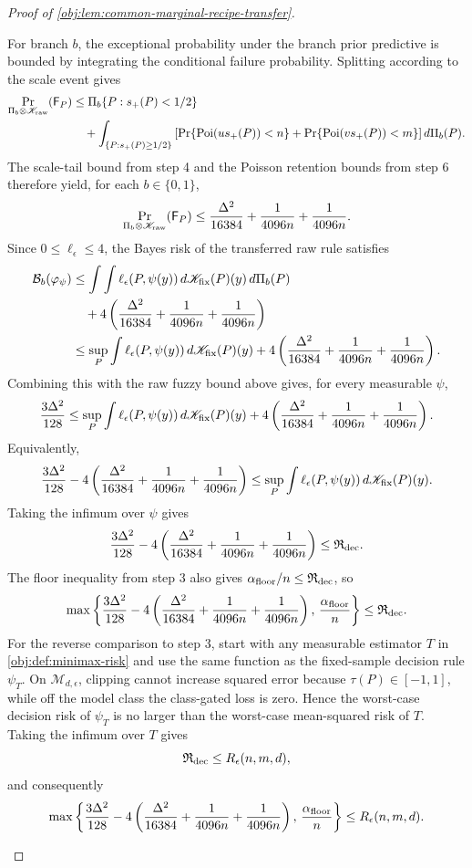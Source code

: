 \documentclass[11pt]{article}
\begin{document}
\begin{proof}[Proof of \cref{obj:lem:common-marginal-recipe-transfer}]
\begin{enumerate}
For branch \(b\), the exceptional probability under the branch prior predictive is bounded by integrating the conditional failure probability.  Splitting according to the scale event gives
\[
\begin{aligned}
\Pr_{\Pi_b\otimes\mathscr K_{\rm raw}}(\mathsf F_P)
&\le
\Pi_b\{P:s_+(P)<1/2\} \\
&\quad+
\int_{\{P:s_+(P)\ge1/2\}}
\left[
\Pr\{\operatorname{Poi}(u s_+(P))<n\}
+
\Pr\{\operatorname{Poi}(v s_+(P))<m\}
\right]d\Pi_b(P).
\end{aligned}
\]
The scale-tail bound from step 4 and the Poisson retention bounds from step 6 therefore yield, for each \(b\in\{0,1\}\),
\[
\Pr_{\Pi_b\otimes\mathscr K_{\rm raw}}(\mathsf F_P)
\le
\frac{\Delta^2}{16384}
+\frac1{4096n}
+\frac1{4096n}.
\]
Since \(0\le\ell_\epsilon\le4\), the Bayes risk of the transferred raw rule satisfies
\[
\begin{aligned}
\mathcal B_b(\varphi_\psi)
&\le
\int
\int \ell_\epsilon(P,\psi(y))\,d\mathscr K_{\rm fix}(P)(y)\,d\Pi_b(P)\\
&\quad+
4\left(
\frac{\Delta^2}{16384}
+\frac1{4096n}
+\frac1{4096n}
\right)\\
&\le
\sup_{P}\int \ell_\epsilon(P,\psi(y))\,d\mathscr K_{\rm fix}(P)(y)
+
4\left(
\frac{\Delta^2}{16384}
+\frac1{4096n}
+\frac1{4096n}
\right).
\end{aligned}
\]
Combining this with the raw fuzzy bound above gives, for every measurable \(\psi\),
\[
\frac{3\Delta^2}{128}
\le
\sup_{P}\int \ell_\epsilon(P,\psi(y))\,d\mathscr K_{\rm fix}(P)(y)
+
4\left(
\frac{\Delta^2}{16384}
+\frac1{4096n}
+\frac1{4096n}
\right).
\]
Equivalently,
\[
\frac{3\Delta^2}{128}
-
4\left(
\frac{\Delta^2}{16384}
+\frac1{4096n}
+\frac1{4096n}
\right)
\le
\sup_{P}\int \ell_\epsilon(P,\psi(y))\,d\mathscr K_{\rm fix}(P)(y).
\]
Taking the infimum over \(\psi\) gives
\[
\frac{3\Delta^2}{128}
-
4\left(
\frac{\Delta^2}{16384}
+\frac1{4096n}
+\frac1{4096n}
\right)
\le
\mathfrak R_{\rm dec}.
\]
The floor inequality from step 3 also gives \(\alpha_{\rm floor}/n\le\mathfrak R_{\rm dec}\), so
\[
\max\left\{
\frac{3\Delta^2}{128}
-
4\left(
\frac{\Delta^2}{16384}
+\frac1{4096n}
+\frac1{4096n}
\right),
\,
\frac{\alpha_{\rm floor}}{n}
\right\}
\le
\mathfrak R_{\rm dec}.
\]
For the reverse comparison to step 3, start with any measurable estimator \(T\) in
\cref{obj:def:minimax-risk} and use the same function as the fixed-sample decision rule
\(\psi_T\).  On \(\mathcal M_{d,\epsilon}\), clipping cannot increase squared error because
\(\tau(P)\in[-1,1]\), while off the model class the class-gated loss is zero.  Hence the
worst-case decision risk of \(\psi_T\) is no larger than the worst-case mean-squared risk of
\(T\).  Taking the infimum over \(T\) gives
\[
\mathfrak R_{\rm dec}
\le
R_\epsilon(n,m,d),
\]
and consequently
\[
\max\left\{
\frac{3\Delta^2}{128}
-
4\left(
\frac{\Delta^2}{16384}
+\frac1{4096n}
+\frac1{4096n}
\right),
\,
\frac{\alpha_{\rm floor}}{n}
\right\}
\le
R_\epsilon(n,m,d).
\] %


\end{enumerate}
\end{proof}
\end{document}

